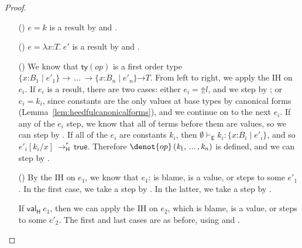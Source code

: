 \documentclass[9pt]{extarticle}
\newcommand{\ottnt}[1]{\mathit{#1}}
\newcommand{\ottmv}[1]{\mathit{#1}}
\newcommand{\ottsym}[1]{#1}
\begin{document}
{\begin{lemma}
\begin{proof}
{\begin{itemize}
    \item[(\T{Const})] $\ottnt{e}  \ottsym{=}  \ottnt{k}$ is a result by  and .

    \item[(\T{Abs})] $\ottnt{e}  \ottsym{=}   \lambda \mathit{x} \mathord{:} \ottnt{T} .~  \ottnt{e'} $ is a result by  and .

    \item[(\T{Op})] We know that $ \mathsf{ty} (\mathord{ \ottnt{op} }) $ is a first order type
      $ {}   \{ \mathit{x} \mathord{:} \ottnt{B_{{\mathrm{1}}}} \mathrel{\mid} \ottnt{e'_{{\mathrm{1}}}} \}   \rightarrow \, ... \, \rightarrow   \{ \mathit{x} \mathord{:} \ottnt{B_{\ottmv{n}}} \mathrel{\mid} \ottnt{e'_{\ottmv{n}}} \}   {} \mathord{ \rightarrow } \ottnt{T} $.
From left to right, we apply the IH on $\ottnt{e_{\ottmv{i}}}$. If $\ottnt{e_{\ottmv{i}}}$ is
      a result, there are two cases: either $\ottnt{e_{\ottmv{i}}}  \ottsym{=}   \mathord{\Uparrow}  \ottnt{l} $, and
      we step by ; or $\ottnt{e_{\ottmv{i}}}  \ottsym{=}  \ottnt{k_{\ottmv{i}}}$, since constants are
      the only values at base types by canonical forms
      (Lemma~\ref{lem:heedfulcanonicalforms}), and we continue on to
      the next $\ottnt{e_{\ottmv{i}}}$. If any of the $\ottnt{e_{\ottmv{i}}}$ step, we know that all
      of terms before them are values, so we can step by
      . If all of the $\ottnt{e_{\ottmv{i}}}$ are constants $\ottnt{k_{\ottmv{i}}}$, then
      $ \emptyset   \vdash _{  \mathsf{E}  }  \ottnt{k_{\ottmv{i}}}  :   \{ \mathit{x} \mathord{:} \ottnt{B_{\ottmv{i}}} \mathrel{\mid} \ottnt{e'_{\ottmv{i}}} \}  $, and so $ \ottnt{e'_{\ottmv{i}}}  [  \ottnt{k_{\ottmv{i}}} / \mathit{x}  ]  \,  \longrightarrow ^{*}_{  \mathsf{H}  }  \,  \mathsf{true} $. Therefore $\denot{ op } \, \ottsym{(}  \ottnt{k_{{\mathrm{1}}}}  \ottsym{,} \, ... \, \ottsym{,}  \ottnt{k_{\ottmv{n}}}  \ottsym{)}$ is defined, and we
      can step by .

    \item[(\T{App})] By the IH on $\ottnt{e_{{\mathrm{1}}}}$, we know that $\ottnt{e_{{\mathrm{1}}}}$: is
      blame, is a value, or steps to some $\ottnt{e'_{{\mathrm{1}}}}$. In the first
      case, we take a step by . In the latter, we take a
      step by .

      If $ \mathsf{val} _{  \mathsf{H}  }~ \ottnt{e_{{\mathrm{1}}}} $, then we can apply the IH on $\ottnt{e_{{\mathrm{2}}}}$, which
      is blame, is a value, or steps to some $\ottnt{e'_{{\mathrm{2}}}}$. The first and
      last cases are as before, using  and .


\end{itemize}}
\end{proof}
\end{lemma}}
\end{document}
